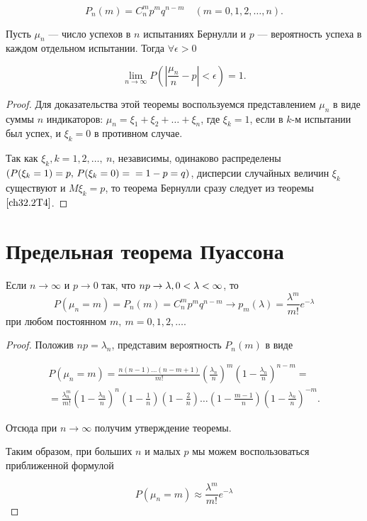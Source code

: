 \begin{equation} \label{ch32.1.1eq1}
P_n(m) = C_n^m p^mq^{n - m} \quad (m = 0,1,2,\ldots,n).
\end{equation}

\begin{thm} [Бернулли]
Пусть $\mu_n$ --- число успехов в $n$ испытаниях Бернулли и $p$ --- вероятность успеха в каждом отдельном испытании. Тогда $\forall \epsilon > 0$

\begin{equation} \label{ch32.2eq7}
\lim_{n \to \infty} P \left( \left| \frac{\mu_n}{n} - p \right| < \epsilon \right) = 1.
\end{equation}
\end{thm}

\begin{proof}
Для доказательства этой теоремы воспользуемся представлением $\mu_n$ в виде суммы $n$ индикаторов: $\mu_n = \xi_1 + \xi_2 + \ldots + \xi_n$, где $\xi_k = 1$, если в $k$-м испытании был успех, и $\xi_k  = 0$ в противном случае.

Так как $\xi_k, k = 1,2,\ldots, \: n$, независимы, одинаково распределены $(P( \xi_k = 1) = p, \,P( \xi_k = 0) =\\= 1 - p = q)$, дисперсии случайных величин $\xi_k$ существуют и $M  \xi_k = p$, то теорема Бернулли сразу следует из теоремы $\ref{ch32.2T4}$.
\end{proof}



\section{Предельная теорема Пуассона}
\begin{thm} [Пуассона]
Если $n \to \infty$ и $p \to 0$ так, что $np \to \lambda, \:\\ 0 < \lambda < \infty$, то
$$
P(\mu_n = m) = P_n(m) = C_n^m p^mq^{n - m} \to p_m(\lambda) = \frac{\lambda^m}{m!} e^{-\lambda}
$$
при любом постоянном $m, \: m = 0,1,2,\dots$.
\end{thm}

\begin{proof}
Положив $np = \lambda_n$, представим вероятность $P_n(m)$ в виде

\begin{multline*}
P(\mu_n = m) = \frac{n(n - 1)\ldots(n - m + 1)}{m!} \left( \frac{\lambda_n}{n}\right)^m\left( 1 - \frac{\lambda_n}{n}\right)^{n - m} = \\
= \frac{\lambda_n^m}{m!} \left( 1 - \frac{\lambda_n}{n}\right)^n \left( 1 - \frac{1}{n}\right)\left(1 - \frac{2}{n} \right) \ldots \left( 1 - \frac{m - 1}{n}\right)\left(1 - \frac{\lambda_n}{n} \right)^{-m}.
\end{multline*}

Отсюда при $n \to \infty$ получим утверждение теоремы.

Таким образом, при больших $n$ и малых $p$ мы можем воспользоваться приближенной формулой

$$
P(\mu_n = m) \approx \frac{\lambda^m}{m!} e^{-\lambda}
$$
\end{proof}
